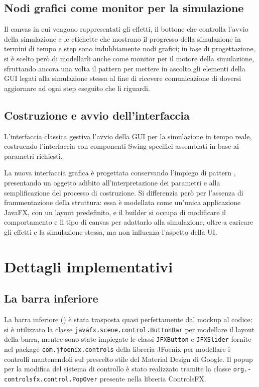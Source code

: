         \subsection{Nodi grafici come monitor per la simulazione}
            Il canvas in cui vengono rappresentati gli effetti, il bottone che controlla l'avvio della simulazione e le etichette che mostrano il progresso della simulazione in termini di tempo e step sono indubbiamente nodi grafici;
            in fase di progettazione, si è scelto però di modellarli anche come monitor per il motore della simulazione, sfruttando ancora una volta il pattern  per mettere in ascolto gli elementi della GUI legati alla simulazione stessa al fine di ricevere comunicazione di doversi aggiornare ad ogni step eseguito che li riguardi.

        \subsection{Costruzione e avvio dell'interfaccia}\label{subsec:avvio}
            L'interfaccia classica gestiva l'avvio della GUI per la simulazione in tempo reale, costruendo l'interfaccia con componenti Swing specifici assemblati in base ai parametri richiesti.

            La nuova interfaccia grafica è progettata conservando l'impiego di pattern , presentando un oggetto adibito all'interpretazione dei parametri e alla semplificazione del processo di costruzione.
            Si differenzia però per l'assenza di frammentazione della struttura:
            essa è modellata come un'unica applicazione JavaFX, con un layout predefinito, e il builder si occupa di modificare il comportamento e il tipo di canvas per adattarlo alla simulazione, oltre a caricare gli effetti e la simulazione stessa, ma non influenza l'aspetto della UI.

    \section{Dettagli implementativi}\label{sec:dettagli}

        \subsection{La barra inferiore}\label{subsec:barra}
            La barra inferiore () è stata trasposta quasi perfettamente dal mockup al codice:
            si è utilizzato la classe \texttt{javafx\dothyp scene\dothyp control\dothyp ButtonBar} per modellare il layout della barra, mentre sono state impiegate le classi \texttt{JFXButton} e \texttt{JFXSlider} fornite nel package \texttt{com\dothyp jfoenix\dothyp controls} della libreria JFoenix per modellare i controlli mantenendoli sul prescelto stile del Material Design di Google.
            Il popup per la modifica del sistema di controllo è stato realizzato tramite la classe \texttt{org\dothyp controlsfx\dothyp control\dothyp PopOver} presente nella libreria ControlsFX.

